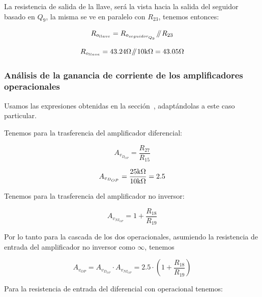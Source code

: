 La resistencia de salida de la llave, será la vista hacia la salida del seguidor basado en $Q_{9}$, la misma se ve en paralelo con $R_{23}$, tenemos entonces:

\begin{equation}
R_{o_{llave}} = R_{o_{seguidor_{Q_{9}}}} \parallelresistors R_{23}
\end{equation}

\begin{equation*}
R_{o_{llave}} = 43.24 \si[per-mode=symbol]{\ohm} \parallelresistors 10 \si[per-mode=symbol]{\kilo\ohm} = 43.05 \si[per-mode=symbol]{\ohm}
\end{equation*}



\subsubsection{Análisis de la ganancia de corriente de los amplificadores operacionales}


Usamos las expresiones obtenidas en la sección~, adaptándolas a este caso particular.

Tenemos para la trasferencia del amplificador diferencial:

\begin{equation}
A_{v_{D_{OP}}} = \frac{R_{27}}{R_{15}}
\end{equation}

\begin{equation*}
A_{v_{D_{OP}}} = \frac{25 \si[per-mode=symbol]{\kilo\ohm}}{10 \si[per-mode=symbol]{\kilo\ohm}} = 2.5
\end{equation*}


Tenemos para la trasferencia del amplificador no inversor:

\begin{equation}
A_{v_{NI_{OP}}} = 1 + \frac{R_{18}}{R_{19}}
\end{equation}


Por lo tanto para la cascada de los dos operacionales, asumiendo la resistencia de entrada del amplificador no inversor como $\infty$, tenemos


\begin{equation}
A_{v_{OP}} = A_{v_{D_{OP}}} \cdot A_{v_{NI_{OP}}} = 2.5 \cdot \left(  1 + \frac{R_{18}}{R_{19}}   \right)
\end{equation}

Para la resistencia de entrada del diferencial con operacional tenemos:

